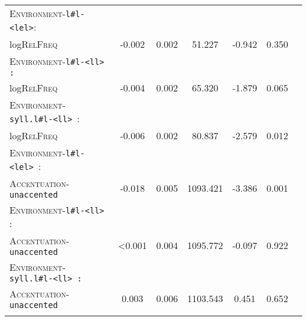 \begin{table}[H]
{\begin{tabular}{lSSSSSS}
		\textsc{Environment}-\texttt{l\#l-<lel>}: &&&&&\\
		log\textsc{RelFreq }& \color{lsLightGray}-0.002 &\color{lsLightGray} 0.002 & \color{lsLightGray}51.227 &\color{lsLightGray} -0.942 & \color{lsLightGray}0.350 \\ 
		
		\textsc{Environment}-\texttt{l\#l-<ll> :}  &&&&&\\
		log\textsc{RelFreq }&\color{lsLightGray} -0.004 & \color{lsLightGray}0.002 &\color{lsLightGray} 65.320 & \color{lsLightGray}-1.879 &\color{lsLightGray} 0.065 \\ 
		
		\textsc{Environment}-\texttt{syll.l\#l-<ll> }: &&&&&\\
		log\textsc{RelFreq }& -0.006 & 0.002 & 80.837 & -2.579 & 0.012 \\ 
		
		\textsc{Environment}-\texttt{l\#l-<lel> }: &&&&&\\
		\textsc{Accentuation}-\texttt{unaccented} & -0.018 & 0.005 & 1093.421 & -3.386 & 0.001 \\ 
		
		\textsc{Environment}-\texttt{l\#l-<ll> }: &&&&&\\
		\textsc{Accentuation}-\texttt{unaccented} & \color{lsLightGray}<0.001&\color{lsLightGray} 0.004 &\color{lsLightGray} 1095.772 & \color{lsLightGray}-0.097 & \color{lsLightGray}0.922 \\ 
		
		\textsc{Environment}-\texttt{syll.l\#l-<ll> :} &&&&&\\
		\textsc{Accentuation}-\texttt{unaccented} &\color{lsLightGray} 0.003 & \color{lsLightGray}0.006 &\color{lsLightGray} 1103.543 & \color{lsLightGray}0.451 &\color{lsLightGray} 0.652 \\ 
	\lspbottomrule 
			\end{tabular}}
\end{table}




